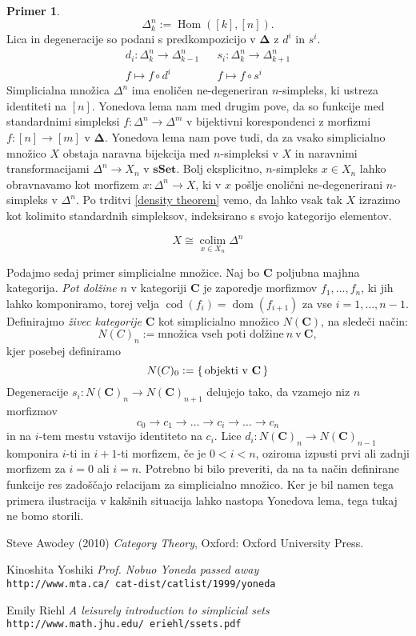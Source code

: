 \documentclass[12pt,a4paper]{book}
\theoremstyle{definition}
\theoremstyle{plain}
\theoremstyle{definition}
\newtheorem{primer}{Primer}[section]
\theoremstyle{remark}
\newcommand{\cat}[1]{\textbf{#1}}
\DeclareMathOperator{\Hom}{Hom}
\DeclareMathOperator{\colim}{colim}
\DeclareMathOperator{\dom}{dom}
\DeclareMathOperator{\cod}{cod}
\renewcommand{\set}[1]{\{\,#1\,\}}
\begin{document}
\begin{primer}
$$\Delta_k^n := \Hom([k], [n]).$$
Lica in degeneracije so podani s predkompozicijo v $\mathbf{\Delta}$ z $d^i$ in $s^i$.
\begin{align*}
d_i : \Delta_k^n \to \Delta_{k-1}^n & & s_i : \Delta_k^n \to \Delta_{k+1}^n \\
f \mapsto f \circ d^i & & f \mapsto f \circ s^i
\end{align*}
Simplicialna množica $\Delta^n$ ima enoličen ne-degeneriran $n$-simpleks, ki ustreza identiteti na $[n]$. Yonedova lema nam med drugim pove, da so funkcije med standardnimi simpleksi $f : \Delta^n \to \Delta^m$ v bijektivni korespondenci z morfizmi $f : [n] \to [m]$ v $\mathbf{\Delta}$. Yonedova lema nam pove tudi, da za vsako simplicialno množico $X$ obstaja naravna bijekcija med $n$-simpleksi v $X$ in naravnimi transformacijami $\Delta^n \to X_n$ v $\cat{sSet}$. Bolj eksplicitno, $n$-simpleks $x \in X_n$ lahko obravnavamo kot morfizem $x : \Delta^n \to X$, ki v $x$ pošlje enolični ne-degenerirani $n$-simpleks v $\Delta^n$.
Po trditvi \ref{density theorem} vemo, da lahko vsak tak $X$ izrazimo kot kolimito standardnih simpleksov, indeksirano s svojo kategorijo elementov.

$$X \cong \underset{x \in X_n}{\colim}\Delta^n$$


Podajmo sedaj primer simplicialne množice. Naj bo $\cat{C}$ poljubna majhna kategorija. \emph{Pot dolžine }$n$ v kategoriji $\cat{C}$ je zaporedje morfizmov $f_1, \ldots, f_n$, ki jih lahko komponiramo, torej velja $\cod(f_i) = \dom(f_{i+1})$ za vse $i = 1, \ldots, n-1$. 
Definirajmo \emph{živec kategorije} $\cat{C}$ kot simplicialno množico $N(\cat{C})$, na sledeči način:
$$N(C)_n :=  \text{množica vseh poti dolžine} \ n \ \text{v} \ \cat{C},$$
kjer posebej definiramo
$$N(C)_0 := \set{\text{objekti v \cat{C}}}$$
Degeneracije $s_i:N(\cat{C})_n \to N(\cat{C})_{n+1}$ delujejo tako, da vzamejo niz $n$ morfizmov
$$ c_0 \rightarrow c_1 \rightarrow \ldots \rightarrow c_i \rightarrow \ldots \rightarrow c_n$$
in na $i$-tem mestu vstavijo identiteto na $c_i$. Lice $d_i : N(\cat{C})_n \to N(\cat{C})_{n-1}$ komponira $i$-ti in $i+1$-ti morfizem, če je $0 < i < n$, oziroma izpusti prvi ali zadnji morfizem za $i = 0$ ali $i = n$.
Potrebno bi bilo preveriti, da na ta način definirane funkcije res zadoščajo relacijam za simplicialno množico. Ker je bil namen tega primera ilustracija v kakšnih situacija lahko nastopa Yonedova lema, tega tukaj ne bomo storili.
\end{primer}

\begin{thebibliography}{9}

Steve Awodey (2010)
\textit{Category Theory},
Oxford: Oxford University Press.

Kinoshita Yoshiki
\textit{Prof. Nobuo Yoneda passed away}
\\\texttt{http://www.mta.ca/~cat-dist/catlist/1999/yoneda}

Emily Riehl
\textit{A leisurely introduction to simplicial sets}
\\\texttt{http://www.math.jhu.edu/~eriehl/ssets.pdf}
\end{thebibliography}
\end{document}
